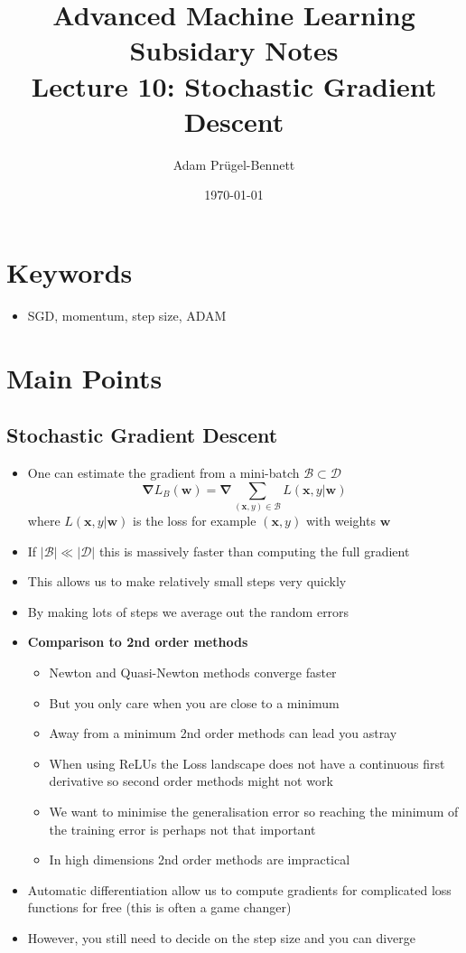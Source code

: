 \documentclass[11pt]{article}
\author{Adam Prügel-Bennett}
\date{\today}
\title{Advanced Machine Learning Subsidary Notes\\\medskip
\large Lecture 10: Stochastic Gradient Descent}
\newcommand{\grad}{\bm{\nabla}}
\begin{document}
\maketitle


\section{Keywords}
\label{sec:orgd0862ff}
\begin{itemize}
\item SGD, momentum, step size, ADAM
\end{itemize}

\section{Main Points}
\label{sec:orgca633a8}

\subsection{Stochastic Gradient Descent}
\label{sec:org2dbf84e}
\begin{itemize}
\item One can estimate the gradient from a mini-batch
\(\mathcal{B}\subset\mathcal{D}\)
$$ \grad L_B(\bm{w}) = \grad \sum_{(\bm{x},y)\in\mathcal{B}} L(\bm{x},y|\bm{w}) $$
where \(L(\bm{x},y|\bm{w})\) is the loss for example \((\bm{x},y)\) with weights \(\bm{w}\)
\item If \(|\mathcal{B}| \ll |\mathcal{D}|\) this is massively faster
than computing the full gradient
\item This allows us to make relatively small steps very quickly
\item By making lots of steps we average out the random errors
\item \textbf{Comparison to 2nd order methods}
\begin{itemize}
\item Newton and Quasi-Newton methods converge faster
\item But you only care when you are close to a minimum
\item Away from a minimum 2nd order methods can lead you astray
\item When using ReLUs the Loss landscape does not have a continuous
first derivative so second order methods might not work
\item We want to minimise the generalisation error so reaching the
minimum of the training error is perhaps not that important
\item In high dimensions 2nd order methods are impractical
\end{itemize}
\item Automatic differentiation allow us to compute gradients for
complicated loss functions for free (this is often a game changer)
\item However, you still need to decide on the step size and you can diverge
\end{itemize}
\end{document}
